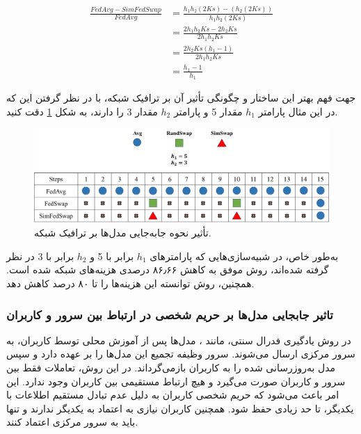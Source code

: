 \begingroup
\addtolength{\jot}{0.5em}
\begin{equation}
	\begin{aligned} 
		\frac{FedAvg-SimFedSwap}{FedAvg}
		&= \frac{h_1h_2(2Ks)-(h_2(2Ks))}{h_1h_2(2Ks)} \\
		&= \frac{2h_1h_2Ks-2h_2Ks}{2h_1h_2Ks} \\
		&= \frac{2h_2Ks(h_1 -1)}{2h_1h_2Ks} \\
		&= \frac{h_1 -1}{h_1}
	\end{aligned}
\end{equation}
\endgroup


جهت فهم بهتر این ساختار و چگونگی تأثیر آن بر ترافیک شبکه، با در نظر گرفتن این که در این مثال پارامتر \(h_1\) مقدار 5 و پارامتر \(h_2\) مقدار 3 را دارند، به شکل
\ref{compare_swap_net_traffic} 
دقت کنید.
\begin{figure}[t]
	\centering
	\includegraphics[scale=0.3]{images/chap4/compare_swap_net_traffic.png}%
	\caption{%
		تأثیر نحوه جابه‌جایی مدل‌ها بر ترافیک شبکه.
	}
	\label{compare_swap_net_traffic}
	\centering
\end{figure}
به‌طور خاص، در شبیه‌سازی‌هایی که پارامترهای \(h_1\) برابر با 5 و \(h_2\) برابر با 3 در نظر گرفته شده‌اند، روش  موفق به کاهش
۸۶٫۶۶
درصدی هزینه‌های شبکه شده است. همچنین، روش  توانسته این هزینه‌ها را تا ۸۰ درصد کاهش دهد. 


\subsubsection{
	تاثیر جابجایی مدل‌ها بر حریم شخصی در ارتباط بین سرور و کاربران
}
در روش یادگیری فدرال سنتی، مانند
%
، مدل‌ها پس از آموزش محلی توسط کاربران، به سرور مرکزی ارسال می‌شوند. سرور وظیفه تجمیع این مدل‌ها را بر عهده دارد و سپس مدل به‌روزرسانی‌ شده را به کاربران بازمی‌گرداند. در این روش، تعاملات فقط بین سرور و کاربران صورت می‌گیرد و هیچ ارتباط مستقیمی بین کاربران وجود ندارد. این امر باعث می‌شود که حریم شخصی کاربران به دلیل عدم تبادل مستقیم اطلاعات با یکدیگر، تا حد زیادی حفظ شود. همچنین کاربران نیازی به اعتماد به یکدیگر ندارند و تنها باید به سرور مرکزی اعتماد کنند.

